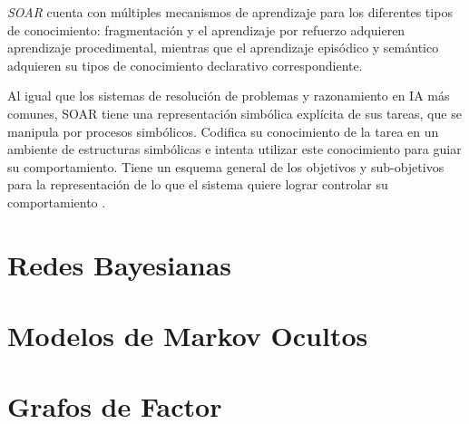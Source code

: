 \emph{SOAR} cuenta con m\'{u}ltiples mecanismos de aprendizaje para los diferentes tipos de conocimiento: fragmentaci\'{o}n y el aprendizaje por refuerzo adquieren aprendizaje procedimental, mientras que el aprendizaje epis\'{o}dico y sem\'{a}ntico adquieren su tipos de conocimiento declarativo correspondiente\cite{langley2009cognitive}.

Al igual que los sistemas de resolución de problemas y razonamiento en IA m\'{a}s comunes, SOAR tiene una representaci\'{o}n simb\'{o}lica expl\'{i}cita de sus tareas, que se manipula por procesos simb\'{o}licos. Codifica su conocimiento de la tarea en un ambiente de estructuras simb\'{o}licas e intenta utilizar este conocimiento para guiar su comportamiento. Tiene un esquema general de los objetivos y sub-objetivos para la representaci\'{o}n de lo que el sistema quiere lograr controlar su comportamiento \cite{laird1987soar}.

\section{Redes Bayesianas}
\section{Modelos de Markov Ocultos}
\section{Grafos de Factor}